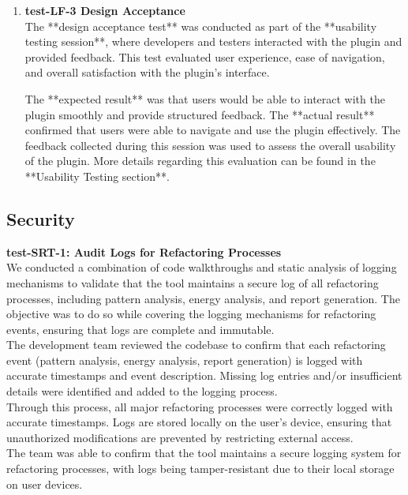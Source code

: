 \documentclass[12pt, titlepage]{article}
\begin{document}
\begin{enumerate}
\item \textbf{test-LF-3 Design Acceptance} \\[2mm]
The **design acceptance test** was conducted as part of the **usability testing session**, where developers and testers interacted with the plugin and provided feedback. This test evaluated user experience, ease of navigation, and overall satisfaction with the plugin’s interface.

The **expected result** was that users would be able to interact with the plugin smoothly and provide structured feedback. The **actual result** confirmed that users were able to navigate and use the plugin effectively. The feedback collected during this session was used to assess the overall usability of the plugin. More details regarding this evaluation can be found in the **Usability Testing section**.

\end{enumerate}

\subsection{Security}

\textbf{test-SRT-1: Audit Logs for Refactoring Processes} \\[2mm]
We conducted a combination of code walkthroughs and static analysis of logging mechanisms to validate that the tool maintains a secure log of all refactoring processes, including pattern analysis, energy analysis, and report generation. The objective was to do so while covering the logging mechanisms for refactoring events, ensuring that logs are complete and immutable.\\

\noindent The development team reviewed the codebase to confirm that each refactoring event (pattern analysis, energy analysis, report generation) is logged with accurate timestamps and event description. Missing log entries and/or insufficient details were identified and added to the logging process.\\

\noindent Through this process, all major refactoring processes were correctly logged with accurate timestamps. Logs are stored locally on the user's device, ensuring that unauthorized modifications are prevented by restricting external access.\\

\noindent The team was able to confirm that the tool maintains a secure logging system for refactoring processes, with logs being tamper-resistant due to their local storage on user devices. 
\end{document}
